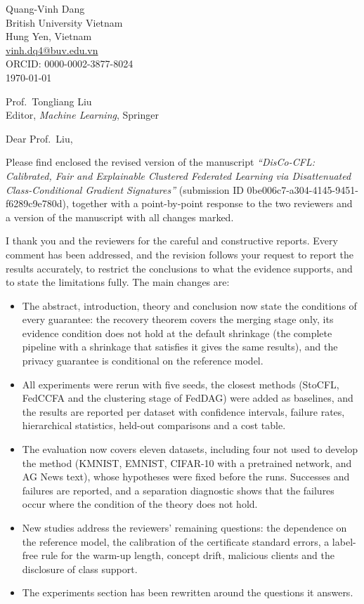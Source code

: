 \documentclass[10.5pt]{article}
\begin{document}
\begin{flushright}
Quang-Vinh Dang\\ British University Vietnam\\ Hung Yen, Vietnam\\ \href{mailto:vinh.dq4@buv.edu.vn}{vinh.dq4@buv.edu.vn}\\ ORCID: 0000-0002-3877-8024\\[0.6em]
\today
\end{flushright}

Prof.\ Tongliang Liu\\
Editor, \emph{Machine Learning}, Springer

Dear Prof.\ Liu,

Please find enclosed the revised version of the manuscript \emph{``DisCo-CFL: Calibrated, Fair and Explainable Clustered Federated Learning via Disattenuated Class-Conditional Gradient Signatures''} (submission ID 0be006c7-a304-4145-9451-f6289c9e780d), together with a point-by-point response to the two reviewers and a version of the manuscript with all changes marked.

I thank you and the reviewers for the careful and constructive reports. Every comment has been addressed, and the revision follows your request to report the results accurately, to restrict the conclusions to what the evidence supports, and to state the limitations fully. The main changes are:
\begin{itemize}\setlength{\itemsep}{2pt}
\item The abstract, introduction, theory and conclusion now state the conditions of every guarantee: the recovery theorem covers the merging stage only, its evidence condition does not hold at the default shrinkage (the complete pipeline with a shrinkage that satisfies it gives the same results), and the privacy guarantee is conditional on the reference model.
\item All experiments were rerun with five seeds, the closest methods (StoCFL, FedCCFA and the clustering stage of FedDAG) were added as baselines, and the results are reported per dataset with confidence intervals, failure rates, hierarchical statistics, held-out comparisons and a cost table.
\item The evaluation now covers eleven datasets, including four not used to develop the method (KMNIST, EMNIST, CIFAR-10 with a pretrained network, and AG News text), whose hypotheses were fixed before the runs. Successes and failures are reported, and a separation diagnostic shows that the failures occur where the condition of the theory does not hold.
\item New studies address the reviewers' remaining questions: the dependence on the reference model, the calibration of the certificate standard errors, a label-free rule for the warm-up length, concept drift, malicious clients and the disclosure of class support.
\item The experiments section has been rewritten around the questions it answers.
\end{itemize}
\end{document}
